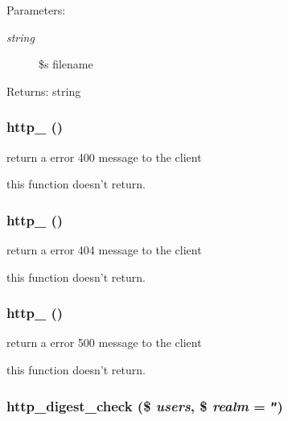 \begin{Desc}
\item[Parameters:]
\begin{description}
\item[{\em string}]\$s filename \end{description}
\end{Desc}
\begin{Desc}
\item[Returns:]string \end{Desc}
\hypertarget{util_8inc_8php_78288ca93c62ce2b5ef34f40352c7324}{
\subsubsection[{http\_\-400}]{\setlength{\rightskip}{0pt plus 5cm}http\_ ()}}
\label{util_8inc_8php_78288ca93c62ce2b5ef34f40352c7324}


return a error 400 message to the client

this function doesn't return. \hypertarget{util_8inc_8php_24f09c2c8205022b013bbee5293a38ae}{
\subsubsection[{http\_\-404}]{\setlength{\rightskip}{0pt plus 5cm}http\_ ()}}
\label{util_8inc_8php_24f09c2c8205022b013bbee5293a38ae}


return a error 404 message to the client

this function doesn't return. \hypertarget{util_8inc_8php_575cc91d803ae46bbc5dfaecbeb3561d}{
\subsubsection[{http\_\-500}]{\setlength{\rightskip}{0pt plus 5cm}http\_ ()}}
\label{util_8inc_8php_575cc91d803ae46bbc5dfaecbeb3561d}


return a error 500 message to the client

this function doesn't return. \hypertarget{util_8inc_8php_ff065fbc9f3abbf9c5a0ebfba22acbf7}{
\subsubsection[{http\_\-digest\_\-check}]{\setlength{\rightskip}{0pt plus 5cm}http\_\-digest\_\-check (\$ {\em users}, \/  \$ {\em realm} = {\tt ''})}}
\label{util_8inc_8php_ff065fbc9f3abbf9c5a0ebfba22acbf7}


